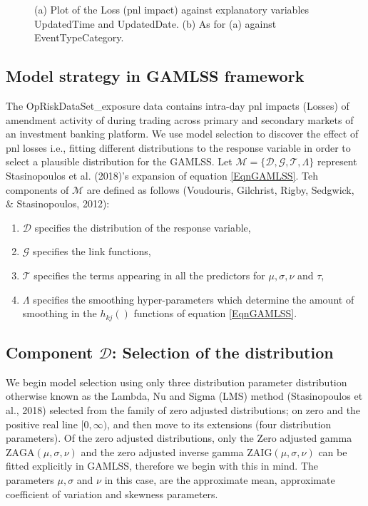 \documentclass{DissertateUSU}
\begin{document}
\begin{figure}
\caption[Loss against explanatory variables]{(a) Plot of the Loss (pnl impact) against explanatory variables UpdatedTime and UpdatedDate. (b) As for (a) against EventTypeCategory.}
\end{figure}

\subsection{Model strategy in GAMLSS framework}

The OpRiskDataSet\_exposure data contains intra-day pnl impacts (Losses)
of amendment activity of during trading across primary and secondary
markets of an investment banking platform. We use model selection to
discover the effect of pnl losses i.e., fitting different distributions
to the response variable in order to select a plausible distribution for
the GAMLSS. Let
\(\mathcal{M}=\{\mathcal{D},\mathcal{G},\mathcal{T},\Lambda\}\)
represent Stasinopoulos et al. (2018)'s expansion of equation
\ref{EqnGAMLSS}. Teh components of \(\mathcal{M}\) are defined as
follows (Voudouris, Gilchrist, Rigby, Sedgwick, \& Stasinopoulos, 2012):

\begin{enumerate}
\item $\mathcal{D}$ specifies the distribution of the response variable,
\item $\mathcal{G}$ specifies the link functions,
\item $\mathcal{T}$ specifies the terms appearing in all the predictors for $\mu,\sigma,\nu$ and $\tau$,
\item $\Lambda$ specifies the smoothing hyper-parameters which determine the amount of smoothing in the $h_{kj}()$ functions of equation
\ref{EqnGAMLSS}.
\end{enumerate}

\subsection{Component $\mathcal{D}$: Selection of the distribution}

We begin model selection using only three distribution parameter
distribution otherwise known as the Lambda, Nu and Sigma (LMS) method
(Stasinopoulos et al., 2018) selected from the family of zero adjusted
distributions; on zero and the positive real line \([0,\infty)\), and
then move to its extensions (four distribution parameters). Of the zero
adjusted distributions, only the Zero adjusted gamma
\(\mbox{ZAGA}(\mu,\sigma,\nu )\) and the zero adjusted inverse gamma
\(\mbox{ZAIG}(\mu,\sigma,\nu )\) can be fitted explicitly in GAMLSS,
therefore we begin with this in mind. The parameters \(\mu,\sigma\) and
\(\nu\) in this case, are the approximate mean, approximate coefficient
of variation and skewness parameters.\medskip  
\end{document}

